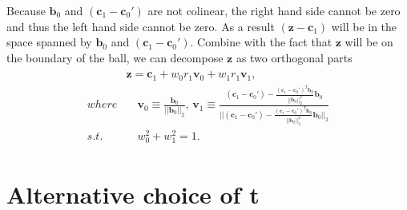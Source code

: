\begin{enumerate}
    Because $\boldsymbol b_0$ and $(\boldsymbol c_1-\boldsymbol c_0')$ are not colinear, the right hand side cannot be zero and thus the left hand side cannot be zero. As a result $(\boldsymbol z- \boldsymbol c_1)$ will be in the space spanned by $\boldsymbol b_0$ and $(\boldsymbol c_1-\boldsymbol c_0')$. Combine with the fact that $\boldsymbol z$ will be on the boundary of the ball, we can decompose $\boldsymbol z$ as two orthogonal parts 
    \begin{gather}
        \begin{aligned}
            &\boldsymbol z=\boldsymbol c_1+w_0 r_1\boldsymbol v_0+w_1 r_1\boldsymbol v_1,\\
            where&\quad \boldsymbol v_0\equiv\frac{\boldsymbol b_0}{||\boldsymbol b_0||_2},\, \boldsymbol v_1\equiv \frac{(\boldsymbol c_1-\boldsymbol c_0')-\frac{(\boldsymbol c_1-\boldsymbol c_0')^T\boldsymbol b_0}{||\boldsymbol b_0||_2^2}\boldsymbol b_0}{||(\boldsymbol c_1-\boldsymbol c_0')-\frac{(\boldsymbol c_1-\boldsymbol c_0')^T\boldsymbol b_0}{||\boldsymbol b_0||_2^2}\boldsymbol b_0||_2}\\
            s.t.&\quad w_0^2+w_1^2=1.
        \end{aligned}
    \end{gather}
\end{enumerate}

\section{Alternative choice of t}

